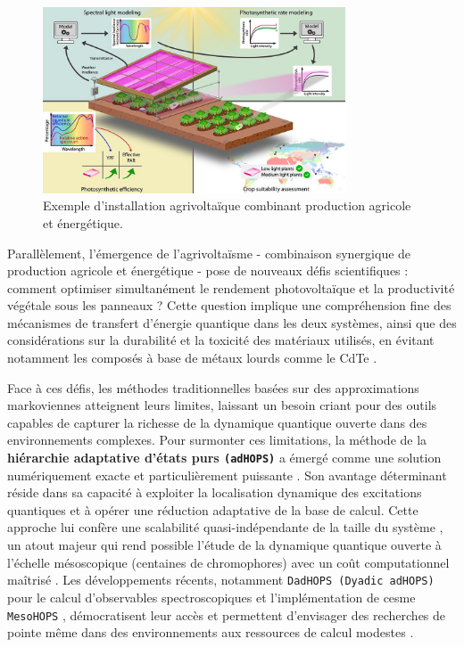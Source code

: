 \documentclass[12pt, a4paper]{article}
\begin{document}
\begin{figure}[htb]
    \centering
    \includegraphics[width=0.8\textwidth]{agri-photovoltaic.jpg}
    \caption{Exemple d'installation agrivoltaïque combinant production agricole et énergétique.}
    \label{fig_agrivoltaic}
\end{figure}

Parallèlement, l'émergence de l'agrivoltaïsme - combinaison synergique de production agricole et énergétique - pose de nouveaux défis scientifiques : comment optimiser simultanément le rendement photovoltaïque et la productivité végétale sous les panneaux ? Cette question implique une compréhension fine des mécanismes de transfert d'énergie quantique dans les deux systèmes, ainsi que des considérations sur la durabilité et la toxicité des matériaux utilisés, en évitant notamment les composés à base de métaux lourds comme le CdTe \cite{archet2018, leb2016}.

Face à ces défis, les méthodes traditionnelles basées sur des approximations markoviennes atteignent leurs limites, laissant un besoin criant pour des outils capables de capturer la richesse de la dynamique quantique ouverte dans des environnements complexes. Pour surmonter ces limitations, la méthode de la \textbf{hiérarchie adaptative d'états purs \texttt{(adHOPS)}} a émergé comme une solution numériquement exacte et particulièrement puissante \cite{Suess2014}. Son avantage déterminant réside dans sa capacité à exploiter la localisation dynamique des excitations quantiques et à opérer une réduction adaptative de la base de calcul. Cette approche lui confère une scalabilité quasi-indépendante de la taille du système \cite{varvelo2021}, un atout majeur qui rend possible l'étude de la dynamique quantique ouverte à l'échelle mésoscopique (centaines de chromophores) avec un coût computationnel maîtrisé \cite{zheng2021}. Les développements récents, notamment \texttt{DadHOPS (Dyadic adHOPS)} pour le calcul d'observables spectroscopiques \cite{Gera2023, Chen2022a} et l'implémentation de cesme \texttt{MesoHOPS} \cite{Citty2024}, démocratisent leur accès et permettent d'envisager des recherches de pointe même dans des environnements aux ressources de calcul modestes \cite{johansson2012}.
\end{document}
